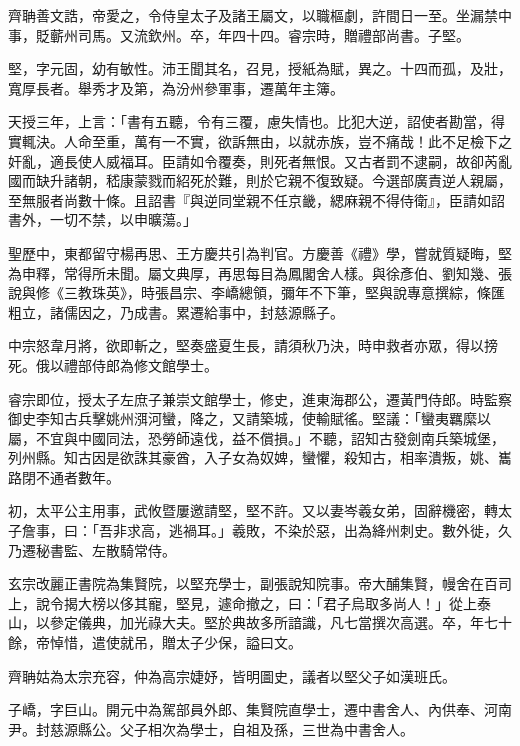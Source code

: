 \begin{pinyinscope}
 齊聃善文誥，帝愛之，令侍皇太子及諸王屬文，以職樞劇，許間日一至。坐漏禁中事，貶蘄州司馬。又流欽州。卒，年四十四。睿宗時，贈禮部尚書。子堅。



 堅，字元固，幼有敏性。沛王聞其名，召見，授紙為賦，異之。十四而孤，及壯，寬厚長者。舉秀才及第，為汾州參軍事，遷萬年主簿。



 天授三年，上言：「書有五聽，令有三覆，慮失情也。比犯大逆，詔使者勘當，得實輒決。人命至重，萬有一不實，欲訴無由，以就赤族，豈不痛哉！此不足檢下之奸亂，適長使人威福耳。臣請如令覆奏，則死者無恨。又古者罰不逮嗣，故卻芮亂國而缺升諸朝，嵇康蒙戮而紹死於難，則於它親不復致疑。今選部廣責逆人親屬，至無服者尚數十條。且詔書『與逆同堂親不任京畿，緦麻親不得侍衛』，臣請如詔書外，一切不禁，以申曠蕩。」



 聖歷中，東都留守楊再思、王方慶共引為判官。方慶善《禮》學，嘗就質疑晦，堅為申釋，常得所未聞。屬文典厚，再思每目為鳳閣舍人樣。與徐彥伯、劉知幾、張說與修《三教珠英》，時張昌宗、李嶠總領，彌年不下筆，堅與說專意撰綜，條匯粗立，諸儒因之，乃成書。累遷給事中，封慈源縣子。



 中宗怒韋月將，欲即斬之，堅奏盛夏生長，請須秋乃決，時申救者亦眾，得以搒死。俄以禮部侍郎為修文館學士。



 睿宗即位，授太子左庶子兼崇文館學士，修史，進東海郡公，遷黃門侍郎。時監察御史李知古兵擊姚州渳河蠻，降之，又請築城，使輸賦徭。堅議：「蠻夷羈縻以屬，不宜與中國同法，恐勞師遠伐，益不償損。」不聽，詔知古發劍南兵築城堡，列州縣。知古因是欲誅其豪酋，入子女為奴婢，蠻懼，殺知古，相率潰叛，姚、巂路閉不通者數年。



 初，太平公主用事，武攸暨屢邀請堅，堅不許。又以妻岑羲女弟，固辭機密，轉太子詹事，曰：「吾非求高，逃禍耳。」羲敗，不染於惡，出為絳州刺史。數外徙，久乃遷秘書監、左散騎常侍。



 玄宗改麗正書院為集賢院，以堅充學士，副張說知院事。帝大酺集賢，幔舍在百司上，說令揭大榜以侈其寵，堅見，遽命撤之，曰：「君子烏取多尚人！」從上泰山，以參定儀典，加光祿大夫。堅於典故多所諳識，凡七當撰次高選。卒，年七十餘，帝悼惜，遣使就吊，贈太子少保，謚曰文。



 齊聃姑為太宗充容，仲為高宗婕妤，皆明圖史，議者以堅父子如漢班氏。



 子嶠，字巨山。開元中為駕部員外郎、集賢院直學士，遷中書舍人、內供奉、河南尹。封慈源縣公。父子相次為學士，自祖及孫，三世為中書舍人。




\end{pinyinscope}
